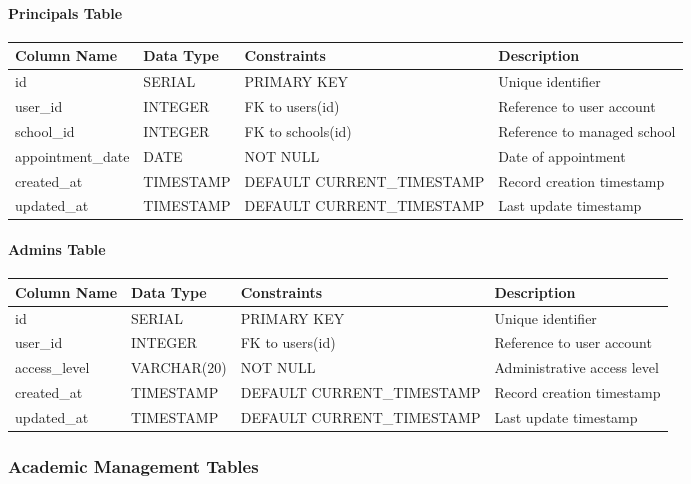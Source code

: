 \documentclass[12pt,a4paper]{report}
\begin{document}
\paragraph{Principals Table}
\begin{longtable}{|p{3cm}|p{3cm}|p{2cm}|p{6cm}|}
\hline
\textbf{Column Name} & \textbf{Data Type} & \textbf{Constraints} & \textbf{Description} \\
\hline
\endhead
id & SERIAL & PRIMARY KEY & Unique identifier \\
\hline
user\_id & INTEGER & FK to users(id) & Reference to user account \\
\hline
school\_id & INTEGER & FK to schools(id) & Reference to managed school \\
\hline
appointment\_date & DATE & NOT NULL & Date of appointment \\
\hline
created\_at & TIMESTAMP & DEFAULT CURRENT\_TIMESTAMP & Record creation timestamp \\
\hline
updated\_at & TIMESTAMP & DEFAULT CURRENT\_TIMESTAMP & Last update timestamp \\
\hline
\end{longtable}

\paragraph{Admins Table}
\begin{longtable}{|p{3cm}|p{3cm}|p{2cm}|p{6cm}|}
\hline
\textbf{Column Name} & \textbf{Data Type} & \textbf{Constraints} & \textbf{Description} \\
\hline
\endhead
id & SERIAL & PRIMARY KEY & Unique identifier \\
\hline
user\_id & INTEGER & FK to users(id) & Reference to user account \\
\hline
access\_level & VARCHAR(20) & NOT NULL & Administrative access level \\
\hline
created\_at & TIMESTAMP & DEFAULT CURRENT\_TIMESTAMP & Record creation timestamp \\
\hline
updated\_at & TIMESTAMP & DEFAULT CURRENT\_TIMESTAMP & Last update timestamp \\
\hline
\end{longtable}

\subsubsection{Academic Management Tables}
\end{document}
